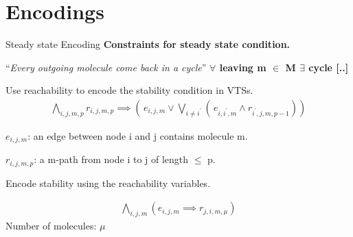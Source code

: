 \documentclass{beamer}
\theoremstyle{definition}
\theoremstyle{remark}
\begin{document}
\section{Encodings}

    \begin{frame} {Steady state Encoding}
    \textbf{Constraints for steady state condition.} \newline
    
``\textit{Every outgoing molecule come back in a cycle}''  \newline
 \hspace{2cm} \textbf{$\forall$ leaving m $\in$ M $\exists$ cycle [..]} \newline
\pause

Use {\color{blue} {reachability}} to encode the stability condition in VTSs.
  \begin{align}
 \bigwedge\limits_{i,j,m,p} r_{i,j,m,p} \implies (\, e_{i,j,m} \lor \bigvee_{i\neq i^{\prime}} ( \, e_{i,i^{\prime},m} \land r_{i^{\prime},j,m,p-1} ) )
  \tag{R}\label{eq:reach1}
\end{align}

$e_{i,j,m}$: an edge between node i and j contains molecule m.

$r_{i,j,m,p}$: a m-path from node i to j of length $\leq$ p.
\end{frame}
 
 \begin{frame}

Encode stability using the reachability variables.

\begin{align}
\bigwedge\limits_{i,j,m} ( e_{i,j,m} \implies r_{j,i,m,\mu})
  \tag{2}\label{eq:reach2}
\end{align}
Number of molecules: $\mu$
    \end{frame}
\end{document}
